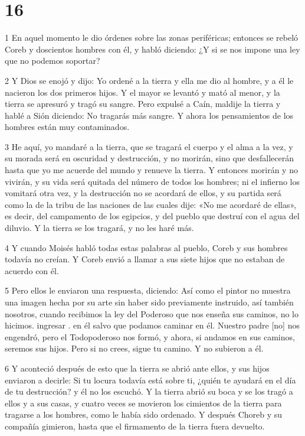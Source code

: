 \chapter{16}

\par 1 En aquel momento le dio órdenes sobre las zonas periféricas; entonces se rebeló Coreb y doscientos hombres con él, y habló diciendo: ¿Y si se nos impone una ley que no podemos soportar?

\par 2 Y Dios se enojó y dijo: Yo ordené a la tierra y ella me dio al hombre, y a él le nacieron los dos primeros hijos. Y el mayor se levantó y mató al menor, y la tierra se apresuró y tragó su sangre. Pero expulsé a Caín, maldije la tierra y hablé a Sión diciendo: No tragarás más sangre. Y ahora los pensamientos de los hombres están muy contaminados.

\par 3 He aquí, yo mandaré a la tierra, que se tragará el cuerpo y el alma a la vez, y su morada será en oscuridad y destrucción, y no morirán, sino que desfallecerán hasta que yo me acuerde del mundo y renueve la tierra. Y entonces morirán y no vivirán, y su vida será quitada del número de todos los hombres; ni el infierno los vomitará otra vez, y la destrucción no se acordará de ellos, y su partida será como la de la tribu de las naciones de las cuales dije: «No me acordaré de ellas», es decir, del campamento de los egipcios, y del pueblo que destruí con el agua del diluvio. Y la tierra se los tragará, y no les haré más.

\par 4 Y cuando Moisés habló todas estas palabras al pueblo, Coreb y sus hombres todavía no creían. Y Coreb envió a llamar a sus siete hijos que no estaban de acuerdo con él.

\par 5 Pero ellos le enviaron una respuesta, diciendo: Así como el pintor no muestra una imagen hecha por su arte sin haber sido previamente instruido, así también nosotros, cuando recibimos la ley del Poderoso que nos enseña sus caminos, no lo hicimos. ingresar . en él salvo que podamos caminar en él. Nuestro padre [no] nos engendró, pero el Todopoderoso nos formó, y ahora, si andamos en sus caminos, seremos sus hijos. Pero si no crees, sigue tu camino. Y no subieron a él.

\par 6 Y aconteció después de esto que la tierra se abrió ante ellos, y sus hijos enviaron a decirle: Si tu locura todavía está sobre ti, ¿quién te ayudará en el día de tu destrucción? y él no los escuchó. Y la tierra abrió su boca y se los tragó a ellos y a sus casas, y cuatro veces se movieron los cimientos de la tierra para tragarse a los hombres, como le había sido ordenado. Y después Choreb y su compañía gimieron, hasta que el firmamento de la tierra fuera devuelto.

